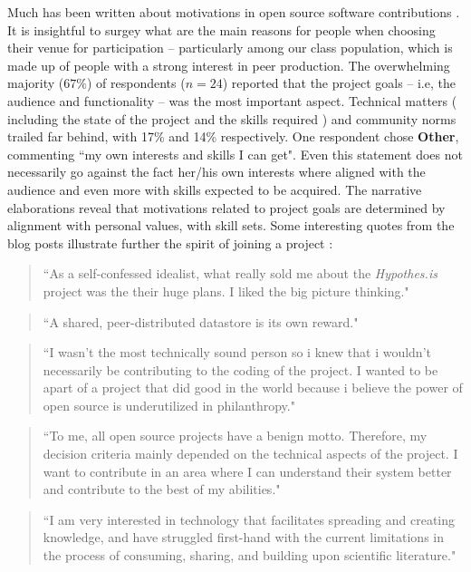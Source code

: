 Much has been written about motivations in open source software
contributions \cite{vonKrogh2012}. It is insightful to surgey what are the main reasons 
for people when choosing their venue for participation -- particularly among
our class population, which is made up of people with a strong interest in peer production. 
The overwhelming majority ($67\%$) of respondents ($n=24$) reported that the project goals -- i.e, the audience and functionality --  was the most important aspect. Technical matters ( including the state of the project and the
skills required ) and community norms trailed far behind, with 17\% and 14\%
respectively. One respondent chose {\bf Other}, commenting ``my own interests and skills I can get". Even this statement does not necessarily go against the fact her/his own interests where aligned with the audience and even more with skills expected to be acquired. The narrative elaborations reveal that motivations related to project goals are determined by alignment with personal values, with skill sets. Some interesting quotes from the blog posts illustrate further the spirit of joining a project :

\begin{quotation} 
``As a self-confessed idealist,  what really sold me about the {\it Hypothes.is} project was the their huge plans. I liked the big picture thinking."
\end{quotation}

\begin{quotation}
``A shared, peer-distributed datastore is its own reward."
\end{quotation}

\begin{quotation}
``I wasn't the most technically sound person so i knew that i wouldn't 
necessarily be contributing to the coding of the project. I wanted to be apart of a 
project that did good in the world because i believe the power of open source is 
underutilized in philanthropy."
\end{quotation}

\begin{quotation}
``To me, all open source projects have a benign motto. Therefore, my decision criteria mainly
 depended on the technical aspects of the project. I want to contribute in an area where I 
 can understand their system better and contribute to the best of my abilities."
 \end{quotation}

\begin{quotation}
``I am very interested in technology that facilitates spreading and creating knowledge, 
and have struggled first-hand with the current limitations in the process of consuming, 
sharing, and building upon scientific literature."
\end{quotation}

